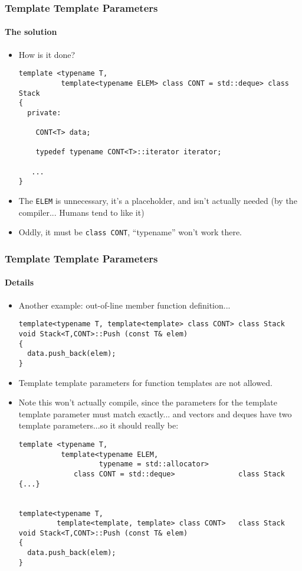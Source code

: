 \begin{frame}[fragile,t]
\frametitle{Template Template Parameters}
\framesubtitle{The solution}
\begin{itemize}[<+->]
\item How is it done?
{\scriptsize
\begin{verbatim}
template <typename T, 
          template<typename ELEM> class CONT = std::deque> class Stack
{
  private: 

    CONT<T> data;
  
    typedef typename CONT<T>::iterator iterator;

   ...
}
\end{verbatim}
}
\item The \texttt{ELEM} is unnecessary, it's a placeholder, and isn't
  actually needed (by the compiler... Humans tend to like it)
\item Oddly, it must be \texttt{class CONT}, ``typename'' won't work there.


\end{itemize}
\end{frame}
\begin{frame}[fragile,t]
\frametitle{Template Template Parameters}
\framesubtitle{Details}
\begin{itemize}[<+->]
\item Another example: out-of-line member function definition...


{\scriptsize
\begin{verbatim}
template<typename T, template<template> class CONT> class Stack
void Stack<T,CONT>::Push (const T& elem)
{
  data.push_back(elem);
}
\end{verbatim}
}
\item Template template parameters for function templates are not
  allowed.
\item Note this won't actually compile, since the parameters for the
  template template parameter must match exactly... and vectors and
  deques have two template parameters...so it should really be:
{\scriptsize
\begin{verbatim}
template <typename T, 
          template<typename ELEM, 
                   typename = std::allocator> 
             class CONT = std::deque>               class Stack
{...}


template<typename T, 
         template<template, template> class CONT>   class Stack
void Stack<T,CONT>::Push (const T& elem)
{
  data.push_back(elem);
}
\end{verbatim}
}

\end{itemize}


\end{frame}



